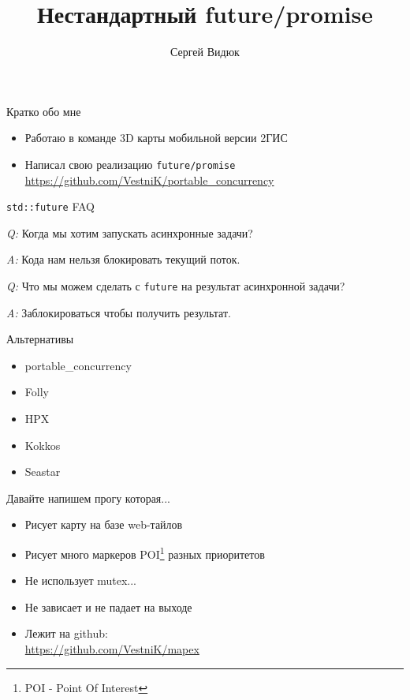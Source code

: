 \documentclass[aspectratio=169,hyperref={unicode},17pt]{beamer}
\title{Нестандартный future/promise}
\author{Сергей Видюк}
\date{}
\begin{document}
\begin{frame}
 \maketitle
\end{frame}

\begin{frame}[t]{Кратко обо мне}
 \begin{itemize}
  \item Работаю в команде 3D карты мобильной версии 2ГИС
  \item Написал свою реализацию \texttt{future/promise} \footnotesize{\url{https://github.com/VestniK/portable_concurrency}}
 \end{itemize}
\end{frame}

\begin{frame}[fragile,t]{\texttt{std::future} FAQ}

{\em Q:} Когда мы хотим запускать асинхронные задачи?

{\em A:} Кода нам нельзя блокировать текущий поток.

{\em Q:} Что мы можем сделать с \texttt{future} на результат асинхронной задачи?

{\em A:} Заблокироваться чтобы получить результат.
\end{frame}

\begin{frame}[fragile,t]{Альтернативы}
\begin{itemize}
  \item portable\_concurrency
  \item Folly
  \item HPX
  \item Kokkos
  \item Seastar
 \end{itemize}
\end{frame}

\begin{frame}[t]{Давайте напишем прогу которая...}
 \begin{itemize}
  \item Рисует карту на базе web-тайлов
  \item Рисует много маркеров POI\footnote{POI - Point Of Interest} разных приоритетов
  \item Не использует mutex...
  \item Не зависает и не падает на выходе
  \item Лежит на github: \\ \footnotesize{\url{https://github.com/VestniK/mapex}}
 \end{itemize}
\end{frame}
\end{document}
